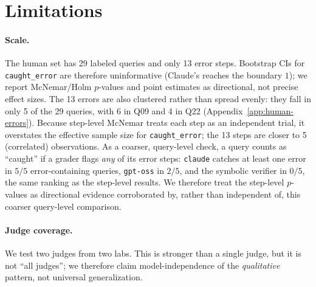 \section*{Limitations}
\label{sec:limitations}

\paragraph{Scale.} The human set has 29 labeled queries and only 13 error steps.
Bootstrap CIs for \texttt{caught\_error} are therefore uninformative (Claude's
reaches the boundary $1$); we report McNemar/Holm $p$-values and point estimates
as directional, not precise effect sizes. The 13 errors are also clustered
rather than spread evenly: they fall in only 5 of the 29 queries, with 6 in Q09
and 4 in Q22 (Appendix~\ref{app:human-errors}). Because step-level McNemar
treats each step as an independent trial, it overstates the effective sample
size for \texttt{caught\_error}; the 13 steps are closer to 5 (correlated)
observations. As a coarser, query-level check, a query counts as ``caught'' if
a grader flags \emph{any} of its error steps: \texttt{claude} catches at least
one error in $5/5$ error-containing queries, \texttt{gpt-oss} in $2/5$, and the
symbolic verifier in $0/5$, the same ranking as the step-level results. We
therefore treat the step-level $p$-values as directional evidence corroborated
by, rather than independent of, this coarser query-level comparison.

\paragraph{Judge coverage.} We test two judges from two labs. This is stronger
than a single judge, but it is not ``all judges''; we therefore claim
model-independence of the \emph{qualitative} pattern, not universal
generalization.

